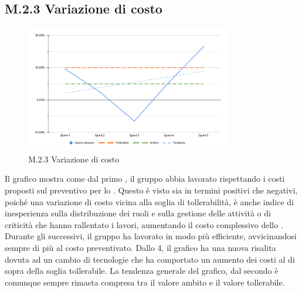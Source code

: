 \subsection{M.2.3 Variazione di costo}
\begin{figure}[H]
    \centering
    \includegraphics[width=0.8\textwidth]{assets/variazione_costo.pdf}
    \caption{M.2.3 Variazione di costo}
\end{figure}

\par Il grafico mostra come dal primo , il gruppo abbia lavorato rispettando i costi proposti sul preventivo per lo . Questo è visto sia in termini positivi che negativi, poiché una variazione di costo vicina alla soglia di tollerabilità, è anche indice di inesperienza sulla distribuzione dei ruoli e sulla gestione delle attività o di criticità che hanno rallentato i lavori, aumentando il costo complessivo dello .
Durante gli  successivi, il gruppo ha lavorato in modo più efficiente, avvicinandosi sempre di più al costo preventivato. Dallo  4, il grafico ha una nuova risalita dovuta ad un cambio di tecnologie che ha comportato un aumento dei costi al di sopra della soglia tollerabile. La tendenza generale del grafico, dal secondo  è comunque sempre rimasta compresa tra il valore ambito e il valore tollerabile. 